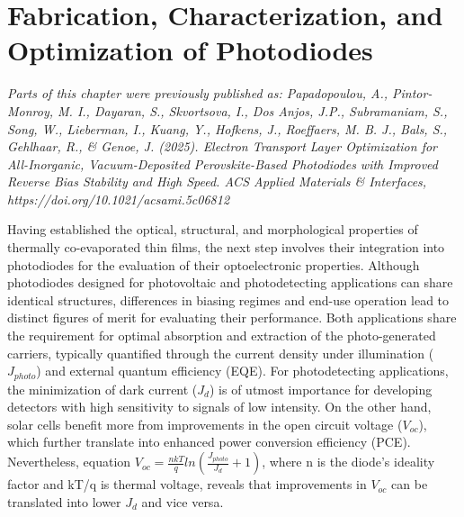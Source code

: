 \chapter{Fabrication, Characterization, and Optimization of  Photodiodes}\label{ch:transport_layer}

\textit{Parts of this chapter were previously published as: Papadopoulou, A., Pintor-Monroy, M. I., Dayaran, S., Skvortsova, I., Dos Anjos, J.P., Subramaniam, S., Song, W., Lieberman, I., Kuang, Y., Hofkens, J., Roeffaers, M. B. J., Bals, S., Gehlhaar, R., \& Genoe, J. (2025). Electron Transport Layer Optimization for All-Inorganic, Vacuum-Deposited Perovskite-Based Photodiodes with Improved Reverse Bias Stability and High Speed. ACS Applied Materials \& Interfaces, https://doi.org/10.1021/acsami.5c06812 }

\vspace{2em}

Having established the optical, structural, and morphological properties of thermally co-evaporated  thin films, the next step involves their integration into photodiodes for the evaluation of their optoelectronic properties. Although photodiodes designed for photovoltaic and photodetecting applications can share identical structures, differences in biasing regimes and end-use operation lead to distinct figures of merit for evaluating their performance. Both applications share the requirement for optimal absorption and extraction of the photo-generated carriers, typically quantified through the current density under illumination ($J_{photo}$) and external quantum efficiency (EQE). For photodetecting applications, the minimization of dark current ($J_d$) is of utmost importance for developing detectors with high sensitivity to signals of low intensity. On the other hand, solar cells benefit more from improvements in the open circuit voltage ($V_{oc}$), which further translate into enhanced power conversion efficiency (PCE). Nevertheless, equation $V_{oc} = \frac{nkT}{q}ln(\frac{J_{photo}}{J_{d}}+1)$, where n is the diode's ideality factor and kT/q is thermal voltage, reveals that improvements in $V_{oc}$ can be translated into lower $J_d$ and vice versa. 

